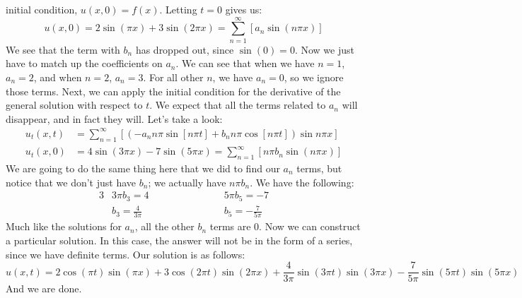initial condition, $u(x,0) = f(x)$. Letting $t= 0$ gives us:
\[
u(x,0) = 2\sin{(\pi x)} + 3\sin{(2\pi x)} = \sum_{n=1}^{\infty}\left[a_{n}\sin{(n\pi x)}\right]
\]
\noindent We see that the term with $b_{n}$ has dropped out, since
$\sin{(0)} = 0$. Now we just have to match up the coefficients on $a_{n}$. We
can see that when we have $n=1$, $a_{n} = 2$, and when $n=2$, $a_{n} = 3$. For
all other $n$, we have $a_{n} = 0$, so we ignore those terms. Next, we can apply
the initial condition for the derivative of the general solution with respect to
$t$. We expect that all the terms related to $a_{n}$ will disappear, and in fact
they will. Let's take a look:
\begin{align*}
u_{t}(x,t) &= \sum_{n=1}^{\infty}\left[(-a_{n}n\pi\sin{[n\pi t]} + b_{n}n\pi\cos{[n\pi t]})\sin{n\pi
x}\right]\\
u_{t}(x,0) &= 4\sin{(3\pi x)} - 7\sin{(5\pi x)} = \sum_{n=1}^{\infty}\left[n\pi b_{n}\sin{(n\pi
x)}\right]
\end{align*}
\noindent We are going to do the same thing here that we did to find our $a_{n}$
terms, but notice that we don't just have $b_{n}$; we actually have $n\pi b_{n}$.
We have the following:
\begin{alignat*}{3}
&3\pi b_{3} = 4 \qquad \qquad \qquad &&5\pi b_{5} = -7\\
&b_{3} = \frac{4}{3\pi} &&b_{5} = -\frac{7}{5\pi}
\end{alignat*}
\noindent Much like the solutions for $a_{n}$, all the other $b_{n}$ terms are 0.
Now we can construct a particular solution. In this case, the answer will not be
in the form of a series, since we have definite terms. Our solution is as follows:
\[
u(x,t) = 2\cos{(\pi t)}\sin{(\pi x)} + 3\cos{(2\pi t)}\sin{(2\pi x)} + \frac{4}{3\pi}\sin{(3\pi
t)}\sin{(3\pi x)} - \frac{7}{5\pi}\sin{(5\pi t)}\sin{(5\pi x)}
\]
\noindent And we are done.
\newpage

